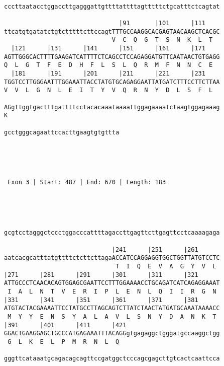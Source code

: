 \documentclass{article}
\begin{document}
\begin{Verbatim}
                                                            
cccttaatacctggaccttgagggattgttttattttagtttttctgcatttctcagtat
                                                            
                                |91       |101      |111    
ttcatgtgatatctgtctttttcttccagtTTTGCCAAGGCACGAGTAACAAGCTCACGC
                              V  C  Q  G  T  S  N  K  L  T  
  |121      |131      |141      |151      |161      |171    
AGTTGGGCACTTTTGAAGATCATTTTCTCAGCCTCCAGAGGATGTTCAATAACTGTGAGG
Q  L  G  T  F  E  D  H  F  L  S  L  Q  R  M  F  N  N  C  E  
  |181      |191      |201      |211      |221      |231    
TGGTCCTTGGGAATTTGGAAATTACCTATGTGCAGAGGAATTATGATCTTTCCTTCTTAA
V  V  L  G  N  L  E  I  T  Y  V  Q  R  N  Y  D  L  S  F  L  
                                                            
AGgttggtgactttgattttcctacacaaataaaattggagaaaatctaagtggagaaag
K                                                           
                                
gcctgggcagaattccacttgaagtgtgttta
                                




 Exon 3 | Start: 487 | End: 670 | Length: 183 




                                                            
gcgtcctagggctccctggacccattttagaccttgagttcttgagttcctcaaaagaga
                                                            
                              |241      |251      |261      
aatcacgcatttatgttttctcttcttagaACCATCCAGGAGGTGGCTGGTTATGTCCTC
                               T  I  Q  E  V  A  G  Y  V  L 
|271      |281      |291      |301      |311      |321      
ATTGCCCTCAACACAGTGGAGCGAATTCCTTTGGAAAACCTGCAGATCATCAGAGGAAAT
 I  A  L  N  T  V  E  R  I  P  L  E  N  L  Q  I  I  R  G  N 
|331      |341      |351      |361      |371      |381      
ATGTACTACGAAAATTCCTATGCCTTAGCAGTCTTATCTAACTATGATGCAAATAAAACC
 M  Y  Y  E  N  S  Y  A  L  A  V  L  S  N  Y  D  A  N  K  T 
|391      |401      |411      |421                          
GGACTGAAGGAGCTGCCCATGAGAAATTTACAGGgtgagaggctgggatgccaaggctgg
 G  L  K  E  L  P  M  R  N  L  Q                            
                                                            
gggttcataaatgcagacagcagttccgatggctcccagcgagcttgtcactcaattcca
                                                            

\end{Verbatim}
\end{document}
